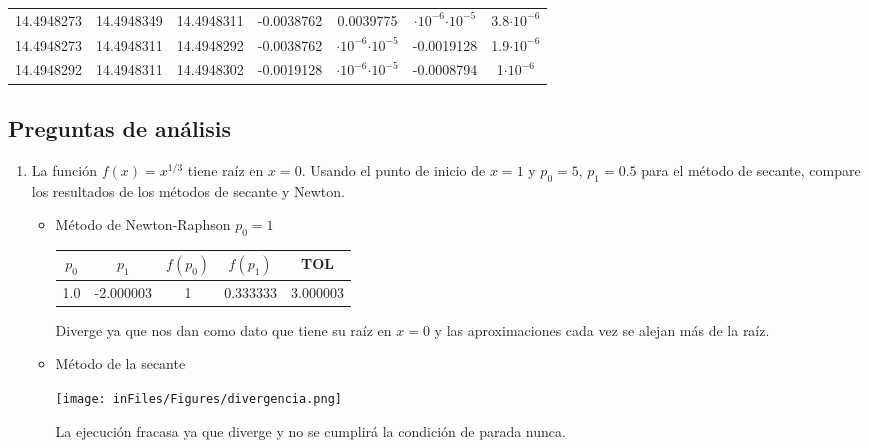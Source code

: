 \documentclass[12pt]{article}
\begin{document}
\begin{enumerate}
\begin{enumerate}
\begin{center}
\begin{tabular}{|c|c|c|c|c|c|c|}
            14.4948273 & 14.4948349 & 14.4948311 & -0.0038762 & 0.0039775 & \(\cdot 10^{-6}\)\(\cdot 10^{-5}\) & 3.8\(\cdot 10^{-6}\) \\
            14.4948273 & 14.4948311 & 14.4948292 & -0.0038762 & \(\cdot 10^{-6}\)\(\cdot 10^{-5}\) & -0.0019128 & 1.9\(\cdot 10^{-6}\) \\
            14.4948292 & 14.4948311 & 14.4948302 & -0.0019128 & \(\cdot 10^{-6}\)\(\cdot 10^{-5}\) & -0.0008794 & 1\(\cdot 10^{-6}\) \\
            \hline 
            \end{tabular}
            \end{center}
    
    \end{enumerate}
\end{enumerate}

\subsection*{Preguntas de análisis}

\begin{enumerate}
\item La función \(f(x) = x^{1/3}\) tiene raíz en \(x = 0\). Usando el punto de inicio de \(x = 1\) y \(p_0 = 5\), \(p_1 = 0.5\) para el método de secante, compare los resultados de los métodos de secante y Newton.

\begin{itemize}
    \item Método de Newton-Raphson \(p_0 = 1\)
    
        \begin{center}
        \begin{tabular}{|c|c|c|c|c|}
        \hline
        \(p_0\) & \(p_1\)& \(f(p_0)\) & \(f(p_1)\) & \textbf{TOL} \\
        \hline
    1.0 & -2.000003 & 1 & 0.333333 &  3.000003 \\
        \hline 
        \end{tabular}
        \end{center}

        Diverge ya que nos dan como dato que tiene su raíz en  \(x = 0\) y las aproximaciones cada vez se alejan más de la raíz.

    \item Método de la secante
    \begin{center}
        \texttt{[image: inFiles/Figures/divergencia.png]}
    \end{center}

    La ejecución fracasa ya que diverge y no se cumplirá la condición de parada nunca.
\end{itemize}
\end{enumerate}
\end{document}
